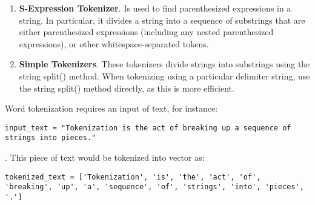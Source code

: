 \begin{enumerate}
    \begin{center}
        \begin{lstlisting}[numbers=none]
        input = "Good muffins cost $3.88\nin New York.  Please buy me\ntwo of them.\n\nThanks."
        regular_expression = ('\w+|\$[\d\.]+|\S+')
        \end{lstlisting}
        \label{figure: regexTokenizer_input}
    \end{center}
    The regular exoression output of the tokenized text:
    \begin{center}
        \begin{lstlisting}[numbers=none]
        ['Good', 'muffins', 'cost', '$3.88', 'in', 'New', 'York', '.',
        'Please', 'buy', 'me', 'two', 'of', 'them', '.', 'Thanks', '.']
        \end{lstlisting}
        \label{figure: regexTokenizer_output}
    \end{center}
    
    \item \textbf{S-Expression Tokenizer}. Is used to find parenthesized expressions in a string. In particular, it divides a string into a sequence of substrings that are either parenthesized expressions (including any nested parenthesized expressions), or other whitespace-separated tokens.
    \item \textbf{Simple Tokenizers}. These tokenizers divide strings into substrings using the string split() method. When tokenizing using a particular delimiter string, use the string split() method directly, as this is more efficient.
\end{enumerate}


Word tokenization requires an input of text, for instance: 

\begin{center}
\begin{lstlisting}[numbers=none]
input_text = "Tokenization is the act of breaking up a sequence of strings into pieces."
\end{lstlisting}
\label{figure: tokenization_input}
\end{center}. 
 This piece of text would be tokenized into vector as: 
\begin{center}
\begin{lstlisting}[numbers=none]
tokenized_text = ['Tokenization', 'is', 'the', 'act', 'of', 'breaking', 'up', 'a', 'sequence', 'of', 'strings', 'into', 'pieces', '.']
\end{lstlisting}
\label{figure: tokenization_output}
\end{center}


